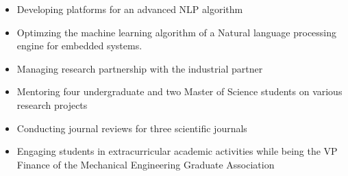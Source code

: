 \documentclass[10pt,letterpaper,ragged2e,compact]{mocv}
\begin{document}
\begin{paracol}{2}
    \begin{itemize}
        \item Developing platforms for an advanced NLP algorithm
        \item Optimzing the machine learning algorithm of a Natural language processing engine for embedded systems.
    \end{itemize}
    \divider
    \begin{itemize}
        \item Managing research partnership with the industrial partner %
        \item Mentoring four undergraduate and two Master of Science students on various research projects
        \item Conducting journal reviews for three scientific journals
        \item Engaging students in extracurricular academic activities while being the VP Finance of the Mechanical Engineering Graduate Association 

\end{itemize}
\end{paracol}
\end{document}
